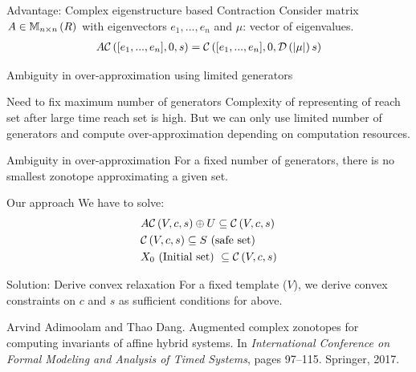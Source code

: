 \begin{frame}{Advantage: Complex eigenstructure based Contraction}
Consider {\color{blue} matrix $A\in\mathbb{M}_{n\times n}\left(R\right)$} with {\color{blue} eigenvectors $e_1,...,e_n$}
and {\color{blue} $\mu$: vector of eigenvalues}.
%
{\color{purple}
\begin{align*}
 A\mathcal{C}\left([e_1,...,e_n],0,s\right)   = \mathcal{C}\left([e_1,...,e_n],0,\mathcal{D}\left(\left|\mu\right|\right)s\right)
\end{align*}
}
%
\end{frame}


\begin{frame}{Ambiguity in over-approximation using
limited generators}
\begin{block}{Need to fix maximum number of generators}
{\color{purple} Complexity} of representing of {\color{purple}
reach set after large time} reach set is {\color{purple} high}.  But we
{\color{blue} can only use limited number of generators} and compute
over-approximation depending on {\color{purple} computation resources}.
\end{block}
%
\begin{block}{Ambiguity in over-approximation}
For a {\color{blue} fixed number of generators}, there is {\color{purple} no smallest zonotope}
approximating a given set.
\end{block}
\end{frame}

\begin{frame}{Our approach}
We have to solve:
{\color{purple}
\begin{align*}
& A\mathcal{C}\left(V,c,s\right)\oplus U\subseteq \mathcal{C}\left(V,c,s\right)\\
& \mathcal{C}\left(V,c,s\right)\subseteq S~\text{(safe set)}\\
& X_0~\text{(Initial set)}~\subseteq \mathcal{C}\left(V,c,s\right)
\end{align*}
}
%
\begin{block}{Solution: Derive convex relaxation}
For a {\color{purple} fixed template ($V$)}, we derive
{\color{blue} convex constraints on
$c$ and $s$} as {\color{blue} sufficient conditions} for above.
\end{block}
%
\begin{thebibliography}{1}

{\small
Arvind Adimoolam and Thao Dang.
\newblock Augmented complex zonotopes for computing invariants of affine hybrid
  systems.
\newblock In {\em International Conference on Formal Modeling and Analysis of
  Timed Systems}, pages 97--115. Springer, 2017.
  }
\end{thebibliography}

\end{frame}

